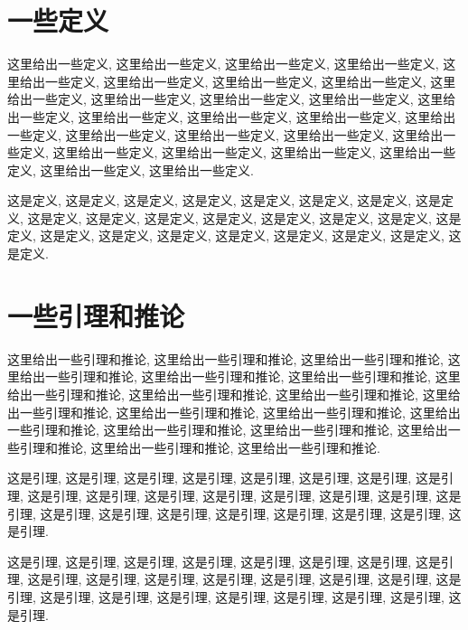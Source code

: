 \documentclass{ecnumaster}
\begin{document}
\section{一些定义}
这里给出一些定义, 这里给出一些定义, 这里给出一些定义,
这里给出一些定义, 这里给出一些定义, 这里给出一些定义,
这里给出一些定义, 这里给出一些定义, 这里给出一些定义,
这里给出一些定义, 这里给出一些定义, 这里给出一些定义,
这里给出一些定义, 这里给出一些定义, 这里给出一些定义,
这里给出一些定义, 这里给出一些定义, 这里给出一些定义,
这里给出一些定义, 这里给出一些定义, 这里给出一些定义,
这里给出一些定义, 这里给出一些定义, 这里给出一些定义,
这里给出一些定义, 这里给出一些定义, 这里给出一些定义.

\begin{definition}
  这是定义, 这是定义, 这是定义, 这是定义, 这是定义, 这是定义,
  这是定义, 这是定义, 这是定义, 这是定义, 这是定义, 这是定义,
  这是定义, 这是定义, 这是定义, 这是定义, 这是定义, 这是定义,
  这是定义, 这是定义, 这是定义, 这是定义, 这是定义, 这是定义.
\end{definition}

\section{一些引理和推论}

这里给出一些引理和推论, 这里给出一些引理和推论, 这里给出一些引理和推论,
这里给出一些引理和推论, 这里给出一些引理和推论, 这里给出一些引理和推论,
这里给出一些引理和推论, 这里给出一些引理和推论, 这里给出一些引理和推论,
这里给出一些引理和推论, 这里给出一些引理和推论, 这里给出一些引理和推论,
这里给出一些引理和推论, 这里给出一些引理和推论, 这里给出一些引理和推论,
这里给出一些引理和推论, 这里给出一些引理和推论, 这里给出一些引理和推论.

\begin{lemma}
  这是引理, 这是引理, 这是引理, 这是引理, 这是引理, 这是引理,
  这是引理, 这是引理, 这是引理, 这是引理, 这是引理, 这是引理,
  这是引理, 这是引理, 这是引理, 这是引理, 这是引理, 这是引理,
  这是引理, 这是引理, 这是引理, 这是引理, 这是引理, 这是引理.
\end{lemma}

\begin{lemma}
  这是引理, 这是引理, 这是引理, 这是引理, 这是引理, 这是引理,
  这是引理, 这是引理, 这是引理, 这是引理, 这是引理, 这是引理,
  这是引理, 这是引理, 这是引理, 这是引理, 这是引理, 这是引理,
  这是引理, 这是引理, 这是引理, 这是引理, 这是引理, 这是引理.
\end{lemma}
\end{document}
